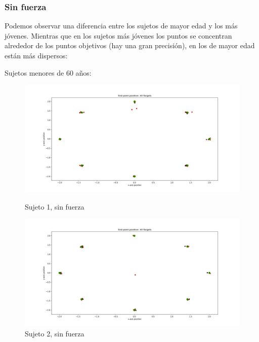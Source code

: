 \documentclass[a4paper,11pt, oneside]{book}
\begin{document}
\subsubsection{Sin fuerza}
Podemos observar una diferencia entre los sujetos de mayor edad y los más jóvenes. Mientras que en los sujetos más jóvenes los puntos se concentran alrededor de los puntos objetivos (hay una gran precisión), en los de mayor edad están más dispersos:

Sujetos menores de 60 años:
\\
\begin{figure}[h]
	\begin{minipage}[b]{0.5\linewidth}
		\centering
		\includegraphics[width=\linewidth]{sujeto1/no_force/trayectorias_puntos}
		\caption{Sujeto 1, sin fuerza}
		\label{fig:figura1}
	\end{minipage}
	\hspace{0.5cm}
	\begin{minipage}[b]{0.5\linewidth}
		\centering
		\includegraphics[width=\linewidth]{sujeto2/no_force/trayectorias_puntos}
		\caption{Sujeto 2, sin fuerza}
		\label{fig:figura2}
	\end{minipage}
\end{figure}
\end{document}

